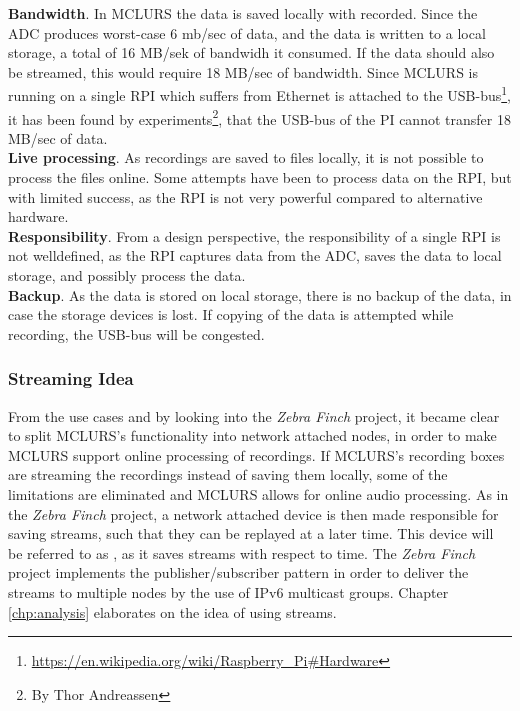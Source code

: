 \textbf{Bandwidth}. In MCLURS the data is saved locally with recorded. Since the ADC produces worst-case 6 mb/sec of data, and the data is written to a local storage, a total of 16 MB/sek of bandwidh it consumed. If the data should also be streamed, this would require 18 MB/sec of bandwidth. Since MCLURS is running on a single RPI which suffers from Ethernet is attached to the USB-bus\footnote{\url{https://en.wikipedia.org/wiki/Raspberry\_Pi\#Hardware}}, it has been found by experiments\footnote{By Thor Andreassen}, that the USB-bus of the PI cannot transfer 18 MB/sec of data.\\

\textbf{Live processing}. As recordings are saved to files locally, it is not possible to process the files online. Some attempts have been to process data on the RPI, but with limited success, as the RPI is not very powerful compared to alternative hardware. \\

\textbf{Responsibility}. From a design perspective, the responsibility of a single RPI is not welldefined, as the RPI captures data from the ADC, saves the data to local storage, and possibly process the data. \\

\textbf{Backup}. As the data is stored on local storage, there is no backup of the data, in case the storage devices is lost. If copying of the data is attempted while recording, the USB-bus will be congested.

 
\subsubsection{Streaming Idea} \label{sec:streamingidea}
From the use cases and by looking into the \textit{Zebra Finch}\citep{larsen2016system} project, it became clear to split MCLURS's functionality into network attached nodes, in order to make MCLURS support online processing of recordings. If MCLURS's recording boxes are streaming the recordings instead of saving them locally, some of the limitations are eliminated and MCLURS allows for online audio processing. As in the \textit{Zebra Finch} project, a network attached device is then made responsible for saving streams, such that they can be replayed at a later time. This device will be referred to as , as it saves streams with respect to time. The \textit{Zebra Finch} project implements the publisher/subscriber pattern in order to deliver the streams to multiple nodes by the use of IPv6 multicast groups. 
Chapter \ref{chp:analysis} elaborates on the idea of using streams.\\


